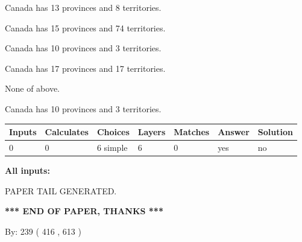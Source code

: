 \documentclass[12pt]{article}
\begin{document}
 
Canada has  13 provinces and  8 territories.
 
 
Canada has  15 provinces and  74 territories.
 
 
Canada has 10  provinces and 3 territories.
 
 
Canada has  17 provinces and  17 territories.
 
 
 None of above.
 
 
\noindent{}
 
 
Canada has 10  provinces and 3 territories.
 
 
\noindent{}
 
 
   
   
   
   
\noindent\begin{tabular}{|l|l|l|l|l|l|l|}
 \hline
Inputs & Calculates & Choices & Layers & Matches & Answer & Solution \\ \hline
 0  & 
 0  & 
 6
  simple  
  & 
 6  & 
 0  & 
  yes & 
  no 
  \\ \hline
 \end{tabular}
   
   
   
   
\noindent{}
   
   
   
   
\noindent\vspace{0.1in}\hspace{-0.08in} {\textbf{\Large{All inputs: }}}
   
   
   
   
   
   
 \vspace{0.2in}
 
   
   
\vspace{2.0in} PAPER TAIL GENERATED.
   
   
   
   
\vspace{1.0in} 
{\textbf{\large{ *** END OF PAPER, THANKS *** }}} 
   
   
\hspace{1.0in} By: 
 239 ( 416 ,  613 )
   
\end{document}
